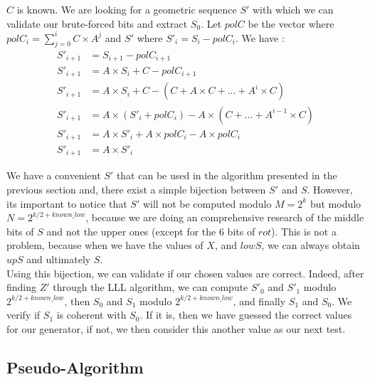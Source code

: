 \documentclass[preprint]{iacrtrans}
\begin{document}
$C$ is known. We are looking for a geometric sequence $S'$ with which we can validate our brute-forced bits and extract $S_0$. Let $polC$ be the vector where $polC_i = \sum_{j=0}^{i} C \times A^j$ and $S'$ where $S'_i = S_i - polC_i$. We have :
\begin{align}
    S'_{i+1} &= S_{i+1} - polC_{i+1}\\
    S'_{i+1} &= A \times S_i + C - polC_{i+1}\\
    S'_{i+1} &= A \times S_i + C - (C + A \times C + ...+ A^{i} \times C)\\
    S'_{i+1} &= A \times (S'_i + polC_i) - A \times (C + ... + A^{i-1} \times C)\\
    S'_{i+1} &= A \times S'_i + A \times polC_i - A \times polC_i\\
    S'_{i+1} &= A \times S'_i
\end{align}

We have a convenient $S'$ that can be used in the algorithm presented in the previous section and, there exist a simple bijection between $S'$ and $S$. However, its important to notice that $S'$ will not be computed modulo $M = 2^k$ but modulo $N = 2^{k/2 + known\_low}$, because we are doing an comprehensive research of the middle bits of $S$ and not the upper ones (except for the 6 bits of $rot$). This is not a problem, because when we have the values of $X$, and $lowS$, we can always obtain $upS$ and ultimately $S$.\\



Using this bijection, we can validate if our chosen values are correct. Indeed, after finding $Z'$ through the LLL algorithm, we can compute $S'_0$ and $S'_1$ modulo $2^{k/2 + known\_low}$, then $S_0$ and $S_1$ modulo $2^{k/2 + known\_low}$, and finally $S_1$ and $S_0$. We verify if $S_1$ is coherent with $S_0$. If it is, then we have guessed the correct values for our generator, if not, we then consider this another value as our next test.

\newpage
 
\subsection{Pseudo-Algorithm}
\end{document}
